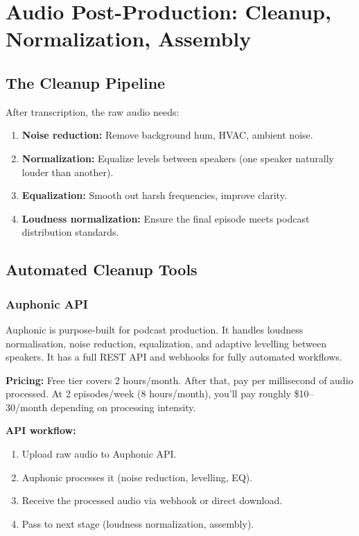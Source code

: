 \documentclass[11pt,letterpaper]{article}
\begin{document}
\vspace{12pt}

\section{Audio Post-Production: Cleanup, Normalization, Assembly}

\subsection{The Cleanup Pipeline}

After transcription, the raw audio needs:

\begin{enumerate}
  \item \textbf{Noise reduction:} Remove background hum, HVAC, ambient noise.
  \item \textbf{Normalization:} Equalize levels between speakers (one speaker naturally louder than another).
  \item \textbf{Equalization:} Smooth out harsh frequencies, improve clarity.
  \item \textbf{Loudness normalization:} Ensure the final episode meets podcast distribution standards.
\end{enumerate}

\subsection{Automated Cleanup Tools}

\subsubsection{Auphonic API}

Auphonic is purpose-built for podcast production. It handles loudness normalisation, noise reduction, equalization, and adaptive levelling between speakers. It has a full REST API and webhooks for fully automated workflows.

\textbf{Pricing:} Free tier covers 2 hours/month. After that, pay per millisecond of audio processed. At 2 episodes/week (8 hours/month), you'll pay roughly \$10–30/month depending on processing intensity.

\textbf{API workflow:}

\begin{enumerate}
  \item Upload raw audio to Auphonic API.
  \item Auphonic processes it (noise reduction, levelling, EQ).
  \item Receive the processed audio via webhook or direct download.
  \item Pass to next stage (loudness normalization, assembly).
\end{enumerate}
\end{document}
